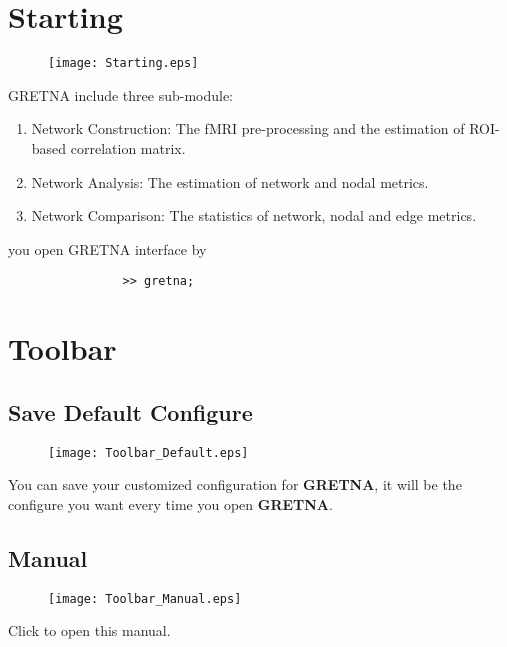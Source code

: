 \documentclass[11pt]{article}
\begin{document}
    \section{Starting}
			\begin{figure}
				\begin{center}
					\texttt{[image: Starting.eps]}
				\end{center}
			\end{figure}
			GRETNA include three sub-module:
            \begin{enumerate}
                \item Network Construction: The fMRI pre-processing and 
                    the estimation of ROI-based correlation matrix.
                \item Network Analysis: The estimation of network and 
                    nodal metrics.
                \item Network Comparison: The statistics of network, nodal
                    and edge metrics.
            \end{enumerate}
			you open GRETNA interface by 
			\begin{lstlisting}
				>> gretna;
			\end{lstlisting}

	\section{Toolbar}
		\subsection{Save Default Configure}
			\begin{figure}
				\begin{center}
					\texttt{[image: Toolbar\_Default.eps]}
				\end{center}
			\end{figure}
			You can save your customized configuration for \textbf{GRETNA}, 
			it will be the configure you want every time you open \textbf{GRETNA}.
		\subsection{Manual}
			\begin{figure}
				\begin{center}
					\texttt{[image: Toolbar\_Manual.eps]}
				\end{center}
			\end{figure}
			Click to open this manual.
\end{document}
